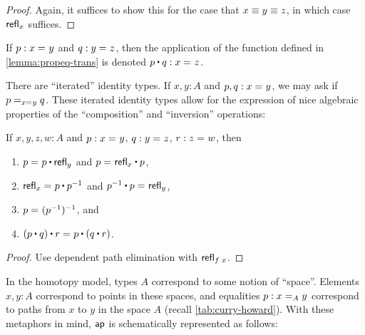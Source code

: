 \documentclass[./thesis.tex]{subfiles}
\begin{document}
\begin{proof}
  Again, it suffices to show this for the case that $x\jdeq y\jdeq z$, 
  in which case $\refl{x}$ suffices.
\end{proof}

If $p:\propeq{}{x}{y}$ and $q:\propeq{}{y}{z}$, then the application of
the function defined in \cref{lemma:propeq-trans} is denoted
$p\ct q:\propeq{}{x}{z}$.

There are ``iterated'' identity types. If $x,y:A$ and $p,q:\propeq{}{x}{y}$, we
may ask if $\propeq{\propeq{}{x}{y}}{p}{q}$. These iterated identity types
allow for the expression of nice algebraic properties of the ``composition''
and ``inversion'' operations:

\begin{lemma}
  If $x,y,z,w:A$ and $p:\propeq{}{x}{y}$, $q:\propeq{}{y}{z}$, $r:\propeq{}{z}{w}$,
  then
  \begin{enumerate}[label=\alph*)]
    \itemsep0em
    \item $\propeq{}{p}{p\ct\refl{y}}$ and $\propeq{}{p}{\refl{x}\ct p}$,
    \item $\propeq{}{\refl{x}}{p\ct p^{-1}}$ and $\propeq{}{p^{-1}\ct p}{\refl{y}}$,
    \item $\propeq{}{p}{(p^{-1})^{-1}}$, and
    \item $\propeq{}{(p\ct q)\ct r}{p \ct (q\ct r)}$.
  \end{enumerate}
\end{lemma}

\begin{proof}
	Use dependent path elimination with $\refl{\apply{f}{x}}$.
\end{proof}

In the homotopy model, types $A$ correspond to some notion of ``space''. 
Elements $x,y:A$ correspond to points in these spaces, and equalities
$p:\propeq{A}{x}{y}$ correspond to paths from $x$ to $y$ in the space $A$
(recall \cref{tab:curry-howard}). With these metaphors in mind, $\ap$ is
schematically represented as follows:
\end{document}
